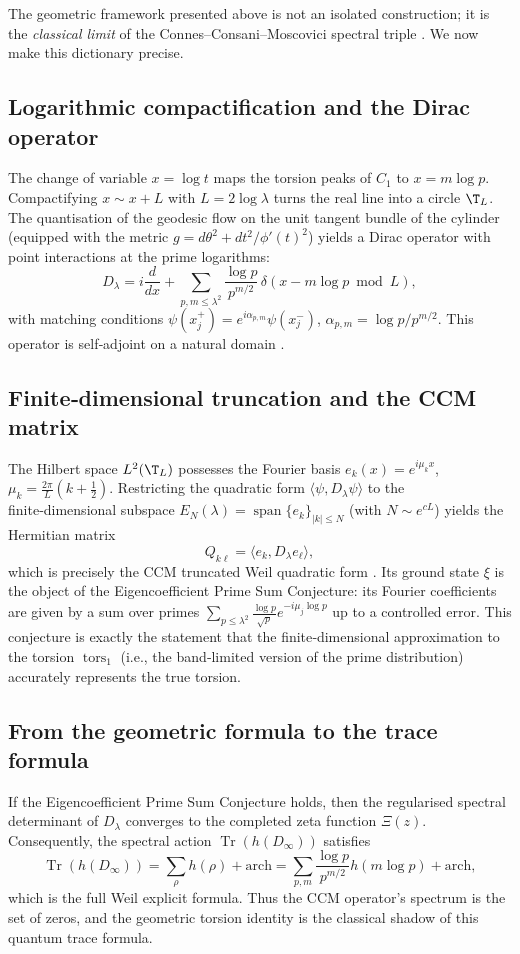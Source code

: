 \documentclass[12pt,a4paper]{article}
\newcommand{\tors}{\operatorname{tors}}
\begin{document}
The geometric framework presented above is not an isolated construction; it is the \emph{classical limit} of the Connes–Consani–Moscovici spectral triple \cite{CCM}.  We now make this dictionary precise.

\subsection{Logarithmic compactification and the Dirac operator}
The change of variable $x = \log t$ maps the torsion peaks of $C_1$ to $x = m\log p$.  Compactifying $x\sim x+L$ with $L=2\log\lambda$ turns the real line into a circle $\T_L$.  The quantisation of the geodesic flow on the unit tangent bundle of the cylinder (equipped with the metric $g = d\theta^2 + dt^2/\phi'(t)^2$) yields a Dirac operator with point interactions at the prime logarithms:
\[
D_\lambda = i\frac{d}{dx} + \sum_{p,m \le \lambda^2} \frac{\log p}{p^{m/2}} \, \delta(x - m\log p \bmod L),
\]
with matching conditions $\psi(x_j^+) = e^{i\alpha_{p,m}}\psi(x_j^-)$, $\alpha_{p,m} = \log p/p^{m/2}$.  This operator is self‑adjoint on a natural domain \cite{Albeverio}.

\subsection{Finite‑dimensional truncation and the CCM matrix}
The Hilbert space $L^2(\T_L)$ possesses the Fourier basis $e_k(x)=e^{i\mu_k x}$, $\mu_k = \frac{2\pi}{L}(k+\frac12)$.  Restricting the quadratic form $\langle \psi, D_\lambda \psi \rangle$ to the finite‑dimensional subspace $E_N(\lambda) = \operatorname{span}\{e_k\}_{|k|\le N}$ (with $N \sim e^{cL}$) yields the Hermitian matrix
\[
Q_{k\ell} = \langle e_k, D_\lambda e_\ell \rangle,
\]
which is precisely the CCM truncated Weil quadratic form \cite{CCM}.  Its ground state $\xi$ is the object of the Eigencoefficient Prime Sum Conjecture: its Fourier coefficients are given by a sum over primes $\sum_{p\le\lambda^2} \frac{\log p}{\sqrt{p}} e^{-i\mu_j \log p}$ up to a controlled error.  This conjecture is exactly the statement that the finite‑dimensional approximation to the torsion $\tors_1$ (i.e., the band‑limited version of the prime distribution) accurately represents the true torsion.

\subsection{From the geometric formula to the trace formula}
If the Eigencoefficient Prime Sum Conjecture holds, then the regularised spectral determinant of $D_\lambda$ converges to the completed zeta function $\Xi(z)$.  Consequently, the spectral action $\operatorname{Tr}(h(D_\infty))$ satisfies
\[
\operatorname{Tr}(h(D_\infty)) = \sum_{\rho} h(\rho) + \text{arch} = \sum_{p,m} \frac{\log p}{p^{m/2}} h(m\log p) + \text{arch},
\]
which is the full Weil explicit formula.  Thus the CCM operator's spectrum is the set of zeros, and the geometric torsion identity is the classical shadow of this quantum trace formula.
\end{document}
